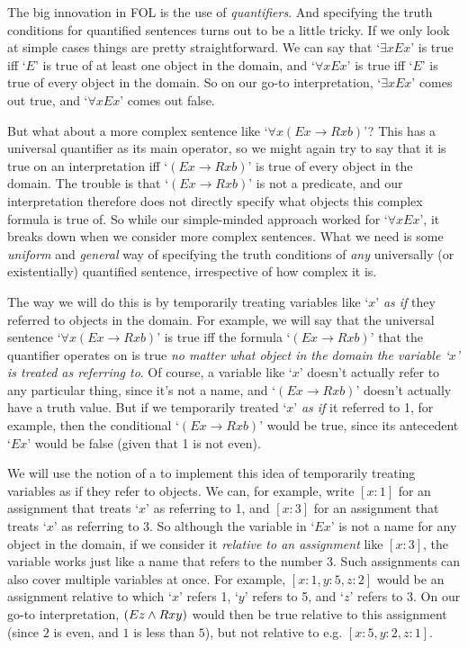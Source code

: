 The big innovation in FOL is the use of \emph{quantifiers}. And specifying the truth conditions for quantified sentences turns out to be a little tricky.  If we only look at simple cases things are pretty straightforward.  We can say that `$\exists xEx$' is true iff `$E$' is true of at least one object in the domain, and  `$\forall xEx$' is true iff `$E$' is true of every object in the domain.  So on our go-to interpretation, `$\exists xEx$' comes out true, and `$\forall xEx$' comes out false.


But what about a more complex sentence like `$\forall x(Ex \rightarrow Rxb)$'?  This has a universal quantifier as its main operator, so we might again try to say that it is true on an interpretation iff `$(Ex \rightarrow Rxb)$' is true of every object in the domain.  The trouble is that `$(Ex \rightarrow Rxb)$' is not a predicate, and our interpretation therefore does not directly specify what objects this complex formula is true of.  So while our simple-minded approach worked for `$\forall xEx$', it breaks down when we consider more complex sentences.  What we need is some \emph{uniform} and \emph{general} way of specifying the truth conditions of \emph{any} universally (or existentially) quantified sentence, irrespective of how complex it is.


The way we will do this is by temporarily treating variables like `$x$' \emph{as if} they referred to objects in the domain.  For example, we will say that the universal sentence `$\forall x(Ex \rightarrow Rxb)$' is true iff the formula `$(Ex \rightarrow Rxb)$' that the quantifier operates on is true \emph{no matter what object in the domain the variable `$x$'  is treated as referring to}. Of course, a variable like `$x$' doesn't actually refer to any particular thing, since it's not a name, and `$(Ex \rightarrow Rxb)$' doesn't actually have a truth value.  But if we temporarily treated `$x$' \emph{as if} it referred to 1, for example, then the conditional `$(Ex \rightarrow Rxb)$' would be true, since its antecedent `$Ex$' would be false (given that 1 is not even).


We will use the notion of a  to implement this idea of temporarily treating variables as if they refer to objects.  We can, for example, write $[x:1]$ for an assignment that treats `$x$' as referring to 1, and $[x:3]$ for an assignment that treats `$x$' as referring to 3.  So although the variable in `$Ex$' is not a name for any object in the domain, if we consider it \emph{relative to an assignment} like $[x:3]$, the variable works just like a name that refers to the number 3.  Such assignments can also cover multiple variables at once.  For example, $[x: 1, y:5, z:2]$ would be an assignment relative to which `$x$' refers 1, `$y$' refers to 5, and `$z$' refers to 3.  On our go-to interpretation, $(Ez \wedge Rxy)$ would then be true relative to this assignment (since $2$ is even, and $1$ is less than $5$), but not relative to e.g. $[x:5, y: 2, z: 1]$.

